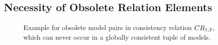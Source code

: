 

\subsection{Necessity of Obsolete Relation Elements}

\begin{figure}
    \centering
    
    \caption[Example for obsolete elements in consistency relations]{Example for obsolete model pairs in consistency relation $\consistencyrelation{CR}{1,2}$, which can never occur in a globally consistent tuple of models.}
    \label{fig:compatibility:obsolete_relations}
\end{figure}

